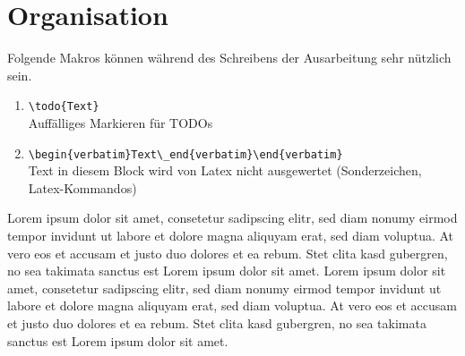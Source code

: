 \chapter{Organisation}

Folgende Makros können während des Schreibens der Ausarbeitung sehr nützlich sein.\\

\begin{enumerate}
 \item \verb|\todo{Text}| \\[1em] Auffälliges Markieren für TODOs
 \item \verb|\begin{verbatim}Text\_end{verbatim}\end{verbatim}| \\[1em] Text in diesem Block wird von Latex nicht ausgewertet (Sonderzeichen, Latex-Kommandos)
\end{enumerate}

Lorem ipsum dolor sit amet, consetetur sadipscing elitr, sed diam nonumy eirmod tempor invidunt ut labore et dolore magna aliquyam erat, sed diam voluptua. At vero eos et accusam et justo duo dolores et ea rebum. Stet clita kasd gubergren, no sea takimata sanctus est Lorem  ipsum dolor sit amet. Lorem ipsum dolor sit amet, consetetur sadipscing elitr, sed diam nonumy eirmod tempor invidunt ut labore et dolore magna aliquyam erat, sed diam voluptua. At vero eos et accusam et justo duo dolores et ea rebum. Stet clita kasd gubergren, no sea takimata sanctus est Lorem ipsum dolor sit amet.\\


\vspace{1em}

